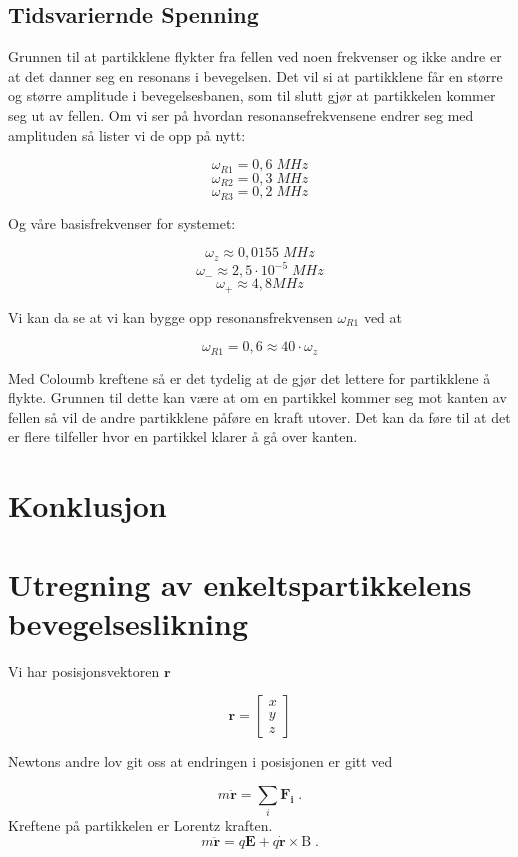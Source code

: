 \documentclass[reprint,english,notitlepage, nofootinbib]{revtex4-1}  %
\begin{document}
\subsection*{Tidsvariernde Spenning}

Grunnen til at partikklene flykter fra fellen ved noen frekvenser og ikke andre er at det danner seg en resonans i bevegelsen. Det vil si at partikklene får en større og større amplitude i bevegelsesbanen, som til slutt gjør at partikkelen kommer seg ut av fellen. Om vi ser på hvordan resonansefrekvensene endrer seg med amplituden så lister vi de opp på nytt:

$$\omega_{R1} = 0,6 \; MHz$$
$$\omega_{R2} = 0,3 \; MHz $$
$$\omega_{R3} = 0,2 \; MHz $$

Og våre basisfrekvenser for systemet:

$$\omega_z \approx 0,0155 \; MHz$$
$$\omega_- \approx 2,5 \cdot 10^{-5} \; MHz$$
$$\omega_+ \approx 4,8 MHz$$

Vi kan da se at vi kan bygge opp resonansfrekvensen $\omega_{R1}$ ved at

$$\omega_{R1} = 0,6 \approx 40 \cdot \omega_z$$

Med Coloumb kreftene så er det tydelig at de gjør det lettere for partikklene å flykte. Grunnen til dette kan være at om en partikkel kommer seg mot kanten av fellen så vil de andre partikklene påføre en kraft utover. Det kan da føre til at det er flere tilfeller hvor en partikkel klarer å gå over kanten. 

\section{Konklusjon}



\newpage
\appendix
\section{Utregning av enkeltspartikkelens bevegelseslikning}\label{ap:moteq}

Vi har posisjonsvektoren $\mathbf{r}$

$$\mathbf{r} = \begin{bmatrix}
x \\ y \\ z 
\end{bmatrix}$$

Newtons andre lov git oss at endringen i posisjonen er gitt ved

$$m \ddot{\mathbf{r}} = \sum_i \mathbf{F_i} \; .$$
Kreftene på partikkelen er Lorentz kraften.
$$m \ddot{\mathbf{r}} = q \mathbf{E} + q \dot{\mathbf{r}} \times\mathrm{B} \; .$$
\end{document}
